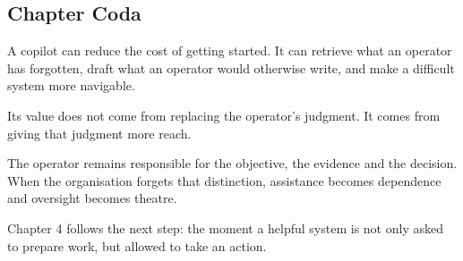 \subsection{Chapter Coda}\label{chapter-coda}

A copilot can reduce the cost of getting started. It can retrieve what
an operator has forgotten, draft what an operator would otherwise write,
and make a difficult system more navigable.

Its value does not come from replacing the operator's judgment. It comes
from giving that judgment more reach.

The operator remains responsible for the objective, the evidence and the
decision. When the organisation forgets that distinction, assistance
becomes dependence and oversight becomes theatre.

Chapter 4 follows the next step: the moment a helpful system is not only
asked to prepare work, but allowed to take an action.
